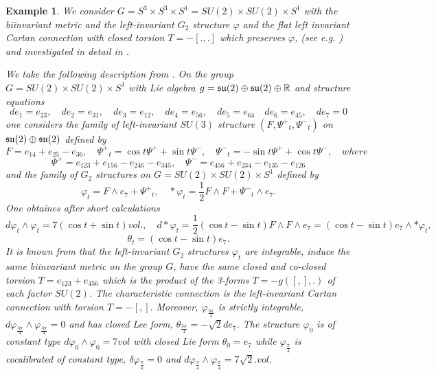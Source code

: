 \documentclass[10pt,british]{article}
\newtheorem{exam}[thrm]{Example}
\def\p{{\varphi}}
\def\ps{{\Psi^+}}
\def\sp{{\Psi^-}}
\begin{document}
 \begin{exam}We consider $G=S^3\times S^3\times S^1=SU(2)\times SU(2)\times S^1$ with the biinvariant metric and the left-invariant  $G_2$ structure $\p$ and the flat left invariant  Cartan  connection with closed  torsion $T=-[.,.]$  which preserves $\p$, (see e.g.  \cite[Example~12.1]{GIP})  and investigated in detail in \cite{FMR}. 

We take the following description from \cite[Proposition~6.2]{FMR}.  On the group $G=SU(2)\times SU(2)\times S^1$ with Lie algebra $g=\frak{su}(2)\oplus \frak{su}(2)\oplus\mathbb R$ and structure equations   
\[de_1=e_{23},\quad de_2=e_{31},\quad de_3=e_{12},\quad de_4=e_{56},\quad de_5=e_{64}\quad de_6=e_{45}, \quad de_7=0\]
one considers the  family of left-invariant $SU(3)$ structure $(F,\ps_t,\sp_t)$ on $\frak{su}(2)\oplus \frak{su}(2)$ defined by
\[F=e_{14}+e_{25}-e_{36},\quad \ps_t=\cos t\ps+\sin t\sp, \quad \sp_t=-\sin t\ps+\cos t\sp, \quad where\]
\[\ps=e_{123}+e_{156}-e_{246}-e_{345},\quad \sp=e_{456}+e_{234}-e_{135}-e_{126} \]
and the family of $G_2$ structures on $G=SU(2)\times SU(2)\times S^1$ defined by
\[\p_t=F \wedge e_7+\ps_t, \quad *\p_t=\frac12F\wedge F+\sp_t\wedge e_7.\]
One obtaines after short calculations 
\[ d\p_t\wedge\p_t=%
7(\cos t+\sin t)vol., \quad 
 d*\p_t=%
\frac12(\cos t-\sin t)F\wedge F\wedge e_7=(\cos t-\sin t)e_7\wedge*\p_t,\]
\[\theta_t=(\cos t-\sin t)e_7.\]
It is known  from \cite[Proposition~4.5, Proposition~6.2]{FMR} that the left-invariant $G_2$ structures %
$\p_t$ are integrable, induce the same biinvariant metric on the group $G$, have the same closed and co-closed torsion $T=e_{123}+e_{456}$ which is the product of the 3-forms $T=-g([,],.)$ of each factor $SU(2)$. The characteristic connection is the left-invariant Cartan connection with torsion $T=-[,].$ Moreover, $\p_{\frac{3\pi}4}$ is strictly integrable,
$d\p_{\frac{3\pi}4}\wedge\p_{\frac{3\pi}4}=0$ and has closed Lee form, 
$\theta_{\frac{3\pi}4}=-\sqrt{2}de_7$. The structure $\p_0$ is of constant type  $d\p_0\wedge\p_0=7vol$ with closed Lie form $\theta_0=e_7$ while  $\p_{\frac{\pi}4}$ is cocalibrated of constant type, $\delta\p_{\frac{\pi}4}=0$ and $d\p_{\frac{\pi}4}\wedge\p_{\frac{\pi}4}=7\sqrt{2}.vol$.
\end{exam}
\end{document}
